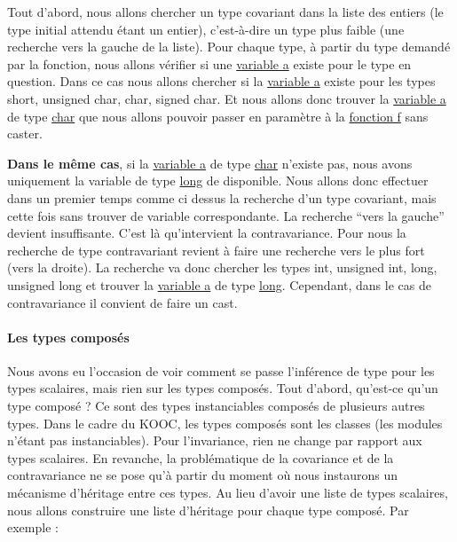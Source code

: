 \documentclass[12pt,a4paper]{article}
\begin{document}
\begin{NoHyper}
Tout d’abord, nous allons chercher un type covariant dans la liste des entiers (le type initial attendu étant un entier), c’est-à-dire un type plus faible (une recherche vers la gauche de la liste). Pour chaque type, à partir du type demandé par la fonction, nous allons vérifier si une \underline{variable a} existe pour le type en question. Dans ce cas nous allons chercher si la \underline{variable a} existe pour les types short, unsigned char, char, signed char. Et nous allons donc trouver la \underline{variable a} de type \underline{char} que nous allons pouvoir passer en paramètre à la \underline{fonction f} sans caster.\newline
\newline

\textbf{Dans le même cas}, si la \underline{variable a} de type \underline{char} n’existe pas, nous avons uniquement la variable de type \underline{long} de disponible. Nous allons donc effectuer dans un premier temps comme ci dessus la recherche d'un type covariant, mais cette fois sans trouver de variable correspondante. La recherche “vers la gauche” devient insuffisante. C'est là qu'intervient la contravariance. Pour nous la recherche de type contravariant revient à faire une recherche vers le plus fort (vers la droite). La recherche va donc chercher les types int, unsigned int, long, unsigned long et trouver la \underline{variable a} de type \underline{long}. Cependant, dans le cas de contravariance il convient de faire un cast.

\paragraph{Les types composés\\}
Nous avons eu l’occasion de voir comment se passe l’inférence de type pour les types scalaires, mais rien sur les types composés.\newline
Tout d’abord, qu’est-ce qu’un type composé ? Ce sont des types instanciables composés de plusieurs autres types. Dans le cadre du KOOC, les types composés sont les classes (les modules n’étant pas instanciables).\newline
Pour l'invariance, rien ne change par rapport aux types scalaires. En revanche, la problématique de la covariance et de la contravariance ne se pose qu’à partir du moment où nous instaurons un mécanisme d'héritage entre ces types. Au lieu d’avoir une liste de types scalaires, nous allons construire une liste d'héritage pour chaque type composé. Par exemple :
\newpage


\end{NoHyper}
\end{document}
